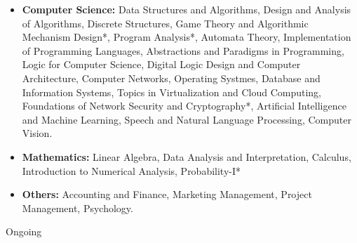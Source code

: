 \begin{itemize}[itemsep = -1.3 mm, leftmargin=*]
% 
\item {\bf Computer Science:} Data Structures and Algorithms, Design 
and Analysis of Algorithms, Discrete Structures, Game Theory and Algorithmic Mechanism Design*, Program Analysis*, Automata Theory, 
Implementation of Programming Languages, Abstractions and Paradigms in 
Programming, Logic for Computer Science, Digital Logic Design and Computer 
Architecture, Computer Networks, Operating Systmes, Database and 
Information Systems, Topics in Virtualization and Cloud Computing,
Foundations of Network Security and Cryptography*, Artificial 
Intelligence and Machine Learning, Speech and Natural Language Processing, Computer Vision.
    
    \item {\bf Mathematics:} Linear Algebra, Data Analysis and Interpretation, Calculus, Introduction to Numerical Analysis, Probability-I*
    \item {\bf Others:} Accounting and Finance, Marketing Management, Project Management, Psychology.
\end{itemize}
\vspace{-13pt}
\hfill * Ongoing
